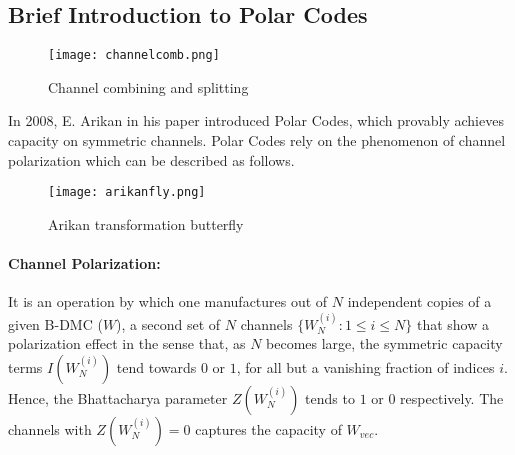 \documentclass[
11pt, %
a4paper, %
oneside, %
headinclude,footinclude, %
BCOR5mm, %
]{scrartcl}
\begin{document}
\subsection{Brief Introduction to Polar Codes}
\begin{wrapfigure}{r}{0.5\textwidth}
  \begin{center}
    \texttt{[image: channelcomb.png]}
  \end{center}
  \caption{Channel combining and splitting}
  \label{fig:channelcomb}
\end{wrapfigure}
In 2008, E. Arikan in his paper \cite{arikan} introduced Polar Codes, which provably achieves capacity on symmetric channels. Polar Codes rely on the phenomenon of channel polarization which can be described as follows.
\begin{wrapfigure}{r}{0.5\textwidth}
  \begin{center}
    \texttt{[image: arikanfly.png]}
  \end{center}
  \caption{Arikan transformation butterfly}
  \label{fig:arikanfly}
\end{wrapfigure}
\paragraph{Channel Polarization:} It is an operation by which one manufactures out of $N$ independent copies of a given B-DMC ($W$), a second set of $N$ channels $\{W^{(i)}_N : 1 \leq i \leq N \}$ that show a polarization effect in the sense that, as $N$ becomes large, the symmetric capacity terms $I(W^{(i)}_N )$ tend towards $0$ or $1$, for all but a vanishing fraction of indices $i$. Hence, the Bhattacharya parameter $Z(W^{(i)}_N)$ tends to $1$ or $0$ respectively. The channels with $Z(W^{(i)}_N)=0$ captures the capacity of $W_{vec}$.
\end{document}

